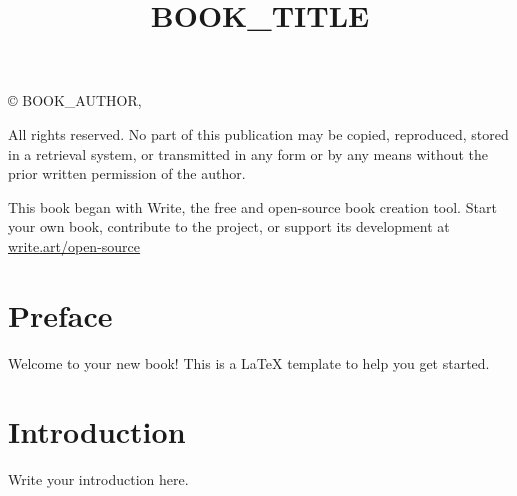 \documentclass[12pt,oneside]{book}
\title{{{BOOK_TITLE}}}
\author{\bookauthor}
\date{}
\newcommand{\bookauthor}{{{BOOK_AUTHOR}}}
\begin{document}
\maketitle
\clearpage
\thispagestyle{empty}
\vspace*{\fill}
\begingroup
\begin{center}
\begin{minipage}{0.6\textwidth}
\tiny
\centering
© \bookauthor, \the\year\par

\vspace{1em}
All rights reserved. No part of this publication may be copied, reproduced, stored in a retrieval system, or transmitted in any form or by any means without the prior written permission of the author.\par

\vspace{1em}
This book began with Write, the free and open-source book creation tool. Start your own book, contribute to the project, or support its development at \href{https://write.art/open-source}{write.art/open-source}\par
\end{minipage}
\end{center}
\endgroup
\vspace*{\fill}
\clearpage

\tableofcontents

\chapter*{Preface}
Welcome to your new book! This is a LaTeX template to help you get started.

% 
% 

\chapter{Introduction}
Write your introduction here.
\end{document}
